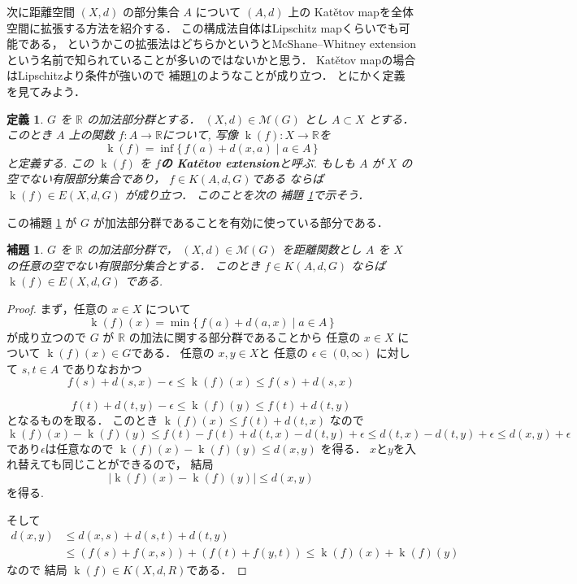 \documentclass[leqno, 12pt]{jsarticle}
\newtheorem{lem}[thm]{補題}
\newtheorem{df}[thm]{定義}
\newcommand{\rr}{\mathbb{R}}
\DeclareMathOperator{\kat}{k}
\begin{document}
次に距離空間
$(X, d)$
の部分集合
$A$
について
$(A, d)$
上の
Kat\v{e}tov mapを全体空間に拡張する方法を紹介する．
この構成法自体はLipschitz mapくらいでも可能である，
というかこの拡張法はどちらかというとMcShane--Whitney extension という名前で知られていることが多いのではないかと思う．
Kat\v{e}tov mapの場合はLipschitzより条件が強いので
補題\ref{lem:katetov:McShane}のようなことが成り立つ．
とにかく定義を見てみよう．

\begin{df}\label{df:katetov:katext}
$G$
を
$\rr$
の加法部分群とする．
$(X, d)\in \mathscr{M}(G)$
とし
$A\subset X$
とする．
このとき
$A$
上の関数
$f\colon A\to \rr$について, 写像
$\kat(f)\colon X\to \rr$を
\[
\kat(f)=\inf \{\, f(a)+d(x,a)\mid a\in A\, \}
\]
と定義する.
この
$\kat(f)$
を
\textbf{$f$の
Kat\v{e}tov extension}と呼ぶ.
もしも
$A$
が
$X$
の空でない有限部分集合であり，
$f\in K(A, d, G)$である
ならば
$\kat(f)\in E(X, d, G)$
が成り立つ．
このことを次の
補題
\ref{lem:katetov:McShane}で示そう．
\end{df}

この補題
\ref{lem:katetov:McShane}
が
$G$
が加法部分群であることを有効に使っている部分である．


\begin{lem}\label{lem:katetov:McShane}
$G$
を
$\rr$
の加法部分群で，
$(X, d)\in \mathscr{M}(G)$
を距離関数とし
$A$
を
$X$
の任意の空でない有限部分集合とする．
このとき
$f\in K(A, d, G)$
ならば
$\kat(f)\in E(X, d, G)$
である.
\end{lem}
\begin{proof}
まず，任意の
$x\in X$
について
\[
\kat(f)(x)=\min\{\, f(a)+d(a, x)\mid a\in A\, \}
\]
が成り立つので
$G$
が
$\rr$
の加法に関する部分群であることから
任意の
$x\in X$
について
$\kat(f)(x)\in G$である．
任意の
$x, y\in X$と
任意の
$\epsilon\in (0, \infty)$
に対して
$s, t\in A$
でありなおかつ
\[
f(s)+d(s, x)-\epsilon  \le \kat(f)(x)\le f(s)+d(s, x)
\]

\[
f(t)+d(t, y)-\epsilon \le \kat(f)(y)\le f(t)+d(t, y)
\]
となるものを取る．
このとき
$\kat(f)(x)\le f(t)+d(t, x)$
なので
\[
\kat(f)(x)-\kat(f)(y)\le f(t)-f(t)+d(t, x)-d(t, y)+\epsilon\le d(t, x)-d(t, y)+\epsilon
\le d(x, y)+\epsilon
\]
であり$\epsilon$は任意なので
$\kat(f)(x)-\kat(f)(y)\le d(x, y)$
を得る．
$x$と$y$を入れ替えても同じことができるので，
結局
\[
|\kat(f)(x)-\kat(f)(y)|\le d(x, y)
\]
を得る.

そして
\begin{align*}
d(x, y)&\le d(x, s)+d(s, t)+d(t, y)\\
&\le (f(s)+f(x, s))+(f(t)+f(y, t))\le \kat(f)(x)+\kat(f)(y)
\end{align*}
なので
結局
$\kat(f)\in K(X, d, R)$である．
\end{proof}
\end{document}
